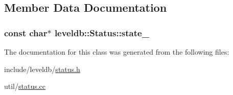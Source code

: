 \subsection{Member Data Documentation}
\hypertarget{classleveldb_1_1_status_a883e92e066654d6e6deaaa31aa0c5e51}{
\subsubsection[{state\-\_\-}]{\setlength{\rightskip}{0pt plus 5cm}const char$\ast$ leveldb\-::\-Status\-::state\-\_\-\hspace{0.3cm}{\ttfamily [private]}}}\label{classleveldb_1_1_status_a883e92e066654d6e6deaaa31aa0c5e51}


The documentation for this class was generated from the following files\-:\begin{DoxyCompactItemize}
\item 
include/leveldb/\hyperlink{status_8h}{status.\-h}\item 
util/\hyperlink{status_8cc}{status.\-cc}\end{DoxyCompactItemize}
